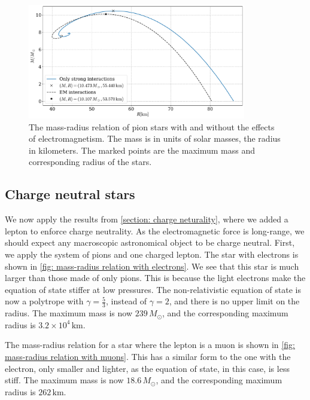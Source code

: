 \begin{figure}[h]
    \centering
    \vspace*{3cm}
    \includegraphics[width=0.85\textwidth]{../scripts/figurer/pion_star/mass_radius_pion_star_compare.pdf}
    \caption{
        The mass-radius relation of pion stars with and without the effects of electromagnetism.
        The mass is in units of solar masses, the radius in kilometers.
        The marked points are the maximum mass and corresponding radius of the stars.
        }
        \label{fig: mass-radius relation comparison}
\end{figure} 

\clearpage


\subsection{Charge neutral stars}


We now apply the results from \autoref{section: charge neturality}, where we added a lepton to enforce charge neutrality.
As the electromagnetic force is long-range, we should expect any macroscopic astronomical object to be charge neutral.
First, we apply the system of pions and one charged lepton.
The star with electrons is shown in \autoref{fig: mass-radius relation with electrons}.
We see that this star is much larger than those made of only pions.
This is because the light electrons make the equation of state stiffer at low pressures.
The non-relativistic equation of state is now a polytrope with $\gamma = \frac{5}{3}$, instead of $\gamma = 2$, and there is no upper limit on the radius.
The maximum mass is now $239\, M_\odot $, and the corresponding maximum radius is $ 3.2\times10^4\,\text{km}$.

The mass-radius relation for a star where the lepton is a muon is shown in \autoref{fig: mass-radius relation with muons}.
This has a similar form to the one with the electron, only smaller and lighter, as the equation of state, in this case, is less stiff.
The maximum mass is now $18.6\, M_\odot $, and the corresponding maximum radius is $ 262 \,\text{km}$.

